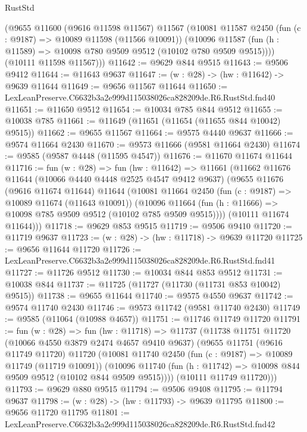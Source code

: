 \begin{lexlean}{RustStd}
\begin{coremodule}
      (@9655
        @11600
        (@9616 @11598 @11567)
        @11567
        (@10081
          @11587
          @2450
          (fun (c : @9187) => @10089 @11598 (@11566 @10091))
          (@10096 @11587 (fun (h : @11589) => @10098 @780 @9509 @9512 (@10102 @780 @9509 @9515))))
        (@10111 @11598 @11567)))
@11642 := @9629 @844 @9515
@11643 := @9506 @9412
@11644 := @11643 @9637
@11647 := (w : @28) -> (hw : @11642) -> @9639 @11644
@11649 := @9656 @11567 @11644
@11650 := LexLeanPreserve.C6632b3a2e999d115038026ca828209de.R6.RustStd.fnd40
@11651 := @11650 @9512
@11654 := @10034 @785 @844 @9512
@11655 := @10038 @785
@11661 := @11649 (@11651 (@11654 (@11655 @844 @10042) @9515))
@11662 := @9655 @11567
@11664 := @9575 @4440 @9637
@11666 := @9574 @11664 @2430
@11670 := @9573 @11666 (@9581 @11664 @2430)
@11674 := @9585 (@9587 @4448 (@11595 @4547))
@11676 := @11670 @11674 @11644
@11716 := fun (w : @28) =>
  fun (hw : @11642) =>
  @11661
    (@11662
      @11676
      @11644
      (@10066 @4440 @4448 @2525 @4547 @9412 @9637)
      (@9655
        @11676
        (@9616 @11674 @11644)
        @11644
        (@10081
          @11664
          @2450
          (fun (c : @9187) => @10089 @11674 (@11643 @10091))
          (@10096 @11664 (fun (h : @11666) => @10098 @785 @9509 @9512 (@10102 @785 @9509 @9515))))
        (@10111 @11674 @11644)))
@11718 := @9629 @853 @9515
@11719 := @9506 @9410
@11720 := @11719 @9637
@11723 := (w : @28) -> (hw : @11718) -> @9639 @11720
@11725 := @9656 @11644 @11720
@11726 := LexLeanPreserve.C6632b3a2e999d115038026ca828209de.R6.RustStd.fnd41
@11727 := @11726 @9512
@11730 := @10034 @844 @853 @9512
@11731 := @10038 @844
@11737 := @11725 (@11727 (@11730 (@11731 @853 @10042) @9515))
@11738 := @9655 @11644
@11740 := @9575 @4550 @9637
@11742 := @9574 @11740 @2430
@11746 := @9573 @11742 (@9581 @11740 @2430)
@11749 := @9585 (@11064 (@10988 @4657))
@11751 := @11746 @11749 @11720
@11791 := fun (w : @28) =>
  fun (hw : @11718) =>
  @11737
    (@11738
      @11751
      @11720
      (@10066 @4550 @3879 @2474 @4657 @9410 @9637)
      (@9655
        @11751
        (@9616 @11749 @11720)
        @11720
        (@10081
          @11740
          @2450
          (fun (c : @9187) => @10089 @11749 (@11719 @10091))
          (@10096 @11740 (fun (h : @11742) => @10098 @844 @9509 @9512 (@10102 @844 @9509 @9515))))
        (@10111 @11749 @11720)))
@11793 := @9629 @880 @9515
@11794 := @9506 @9408
@11795 := @11794 @9637
@11798 := (w : @28) -> (hw : @11793) -> @9639 @11795
@11800 := @9656 @11720 @11795
@11801 := LexLeanPreserve.C6632b3a2e999d115038026ca828209de.R6.RustStd.fnd42

\end{coremodule}
\end{lexlean}
